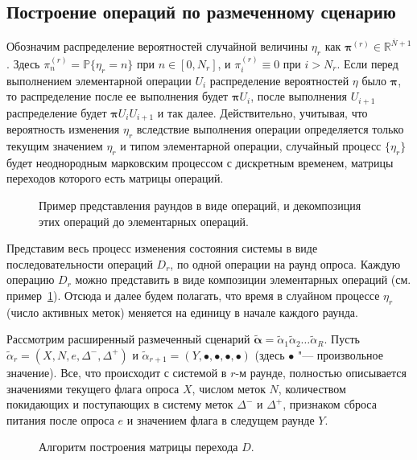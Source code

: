 \subsection{Построение операций по размеченному сценарию}\label{subsec:ch3_bg_round_op_matrices}
Обозначим распределение вероятностей случайной величины $\eta_r$ как $\bm{\pi}^{(r)} \in \mathbb{R}^{\overline{N}+1}$. Здесь $\pi_n^{(r)} = \mathbb{P}\{\eta_r = n \}$ при $n \in [0, N_r]$, и $\pi_i^{(r)} \equiv 0$ при $i > N_r$. Если перед выполнением элементарной операции $U_i$ распределение вероятностей $\eta$ было $\bm{\pi}$, то распределение после ее выполнения будет $\bm{\pi}U_i$, после выполнения $U_{i+1}$ распределение будет $\bm{\pi} U_i U_{i+1}$ и так далее. Действительно, учитывая, что вероятность изменения $\eta_r$ вследствие выполнения операции определяется только текущим значением $\eta_r$ и типом элементарной операции, случайный процесс $\{ \eta_r \}$ будет неоднородным марковским процессом с дискретным временем, матрицы переходов которого есть матрицы операций.

\begin{figure}[htb]
  \caption{Пример представления раундов в виде операций, и декомпозиция этих операций до элементарных операций.}
  \label{fig:ch3_decomposition}
\end{figure}

Представим весь процесс изменения состояния системы в виде последовательности операций $D_r$, по одной операции на раунд опроса. Каждую операцию $D_r$ можно представить в виде композиции элементарных операций (см. пример~\ref{fig:ch3_decomposition}). Отсюда и далее будем полагать, что время в слуайном процессе $\eta_r$ (число активных меток) меняется на единицу в начале каждого раунда.

Рассмотрим расширенный размеченный сценарий $\widetilde{\bm{\alpha}} = \widetilde{\alpha}_1 \widetilde{\alpha}_2 \dots \widetilde{\alpha}_R$. Пусть $\widetilde{\alpha}_r = (X, N, e, \Delta^-, \Delta^+)$ и $\widetilde{\alpha}_{r+1} = (Y, \bullet, \bullet, \bullet, \bullet)$ (здесь $\bullet$ "--- произвольное значение). Все, что происходит с системой в $r$-м раунде, полностью описывается значениями текущего флага опроса $X$, числом меток $N$, количеством покидающих и поступающих в систему меток $\Delta^-$ и $\Delta^+$, признаком сброса питания после опроса $e$ и значением флага в следущем раунде $Y$.

\begin{figure}[htb]
  \caption{Алгоритм построения матрицы перехода $D$.}
  \label{fig:ch3_matrix_composition}
\end{figure}

